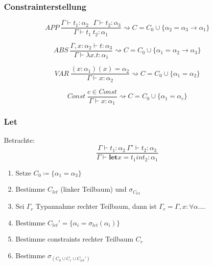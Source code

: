 \subsubsection{Constrainterstellung}
\label{typ:con:crea}
$$APP \medspace\frac{\Gamma \vdash t_1 : \alpha_2 \medspace\medspace\medspace \Gamma \vdash t_2 : \alpha_3}{\Gamma \vdash t_1 \medspace t_2 : \alpha_1} \rightsquigarrow C = C_0 \cup \{\alpha_2 = \alpha_3 \rightarrow \alpha_1\}$$

$$ABS \medspace\frac{\Gamma, x : \alpha_2 \vdash t : \alpha_3}{\Gamma \vdash \lambda x.t:\alpha_1} \rightsquigarrow C = C_0 \cup \{\alpha_1 = \alpha_2 \rightarrow \alpha_3\}$$

$$VAR \medspace\frac{(x: \alpha_1)(x) = \alpha_2}{\Gamma \vdash x : \alpha_2} \rightsquigarrow C = C_0 \cup \{\alpha_1 = \alpha_2\}$$

$$Const \medspace\frac{c \in Const}{\Gamma \vdash x : \alpha_1} \rightsquigarrow C = C_0 \cup \{\alpha_1 = \alpha_c\}$$

\subsubsection{Let}
Betrachte:
$$\frac{\Gamma \vdash t_1: \alpha_2 \medspace \Gamma' \vdash t_2: \alpha_3}{\Gamma \vdash \textbf{let} x = t_1 in t_2 : \alpha_1}$$

\begin{enumerate}
	\item Setze $C_0 \coloneqq \{ \alpha_1 = \alpha_3 \}$
	\item Bestimme $C_{let}$ (linker Teilbaum) und $\sigma_{C_{let}}$
	\item Sei $\Gamma_r$ Typannahme rechter Teilbaum, dann ist $\Gamma_r = \Gamma, x: \forall \alpha. ...$
	\item Bestimme $C_{let}' = \{\alpha_i = \sigma_{let}(\alpha_i)\}$
	\item Bestimme constraints rechter Teilbaum $C_r$
	\item Bestimme $\sigma_{(C_0 \cup C_r \cup C_{let}')}$
\end{enumerate}